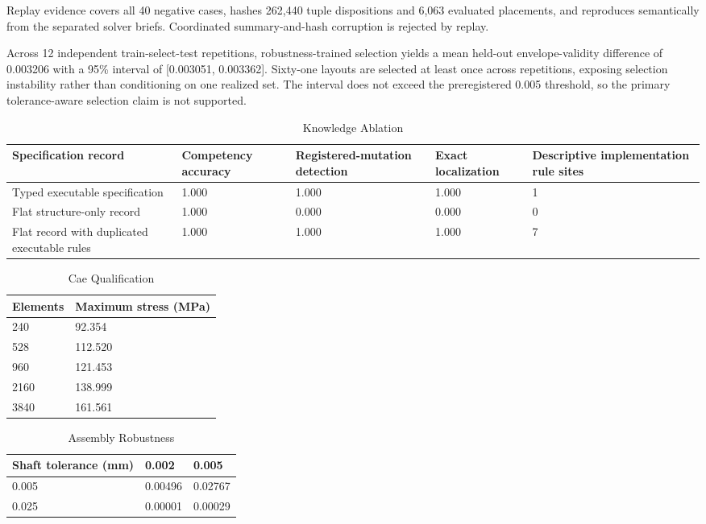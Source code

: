 \documentclass[preprint,12pt]{elsarticle}
\begin{document}
Replay evidence covers all 40 negative cases, hashes 262,440 tuple dispositions and 6,063 evaluated placements, and reproduces semantically from the separated solver briefs. Coordinated summary-and-hash corruption is rejected by replay.

Across 12 independent train-select-test repetitions, robustness-trained selection yields a mean held-out envelope-validity difference of 0.003206 with a 95\% interval of [0.003051, 0.003362]. Sixty-one layouts are selected at least once across repetitions, exposing selection instability rather than conditioning on one realized set. The interval does not exceed the preregistered 0.005 threshold, so the primary tolerance-aware selection claim is not supported.

\begin{table}[htbp]
\centering
\caption{Knowledge Ablation}
\small
\begin{tabular}{lllll}
\textbf{Specification record} & \textbf{Competency accuracy} & \textbf{Registered-mutation detection} & \textbf{Exact localization} & \textbf{Descriptive implementation rule sites} \\
\hline
Typed executable specification & 1.000 & 1.000 & 1.000 & 1 \\
Flat structure-only record & 1.000 & 0.000 & 0.000 & 0 \\
Flat record with duplicated executable rules & 1.000 & 1.000 & 1.000 & 7 \\
\end{tabular}
\end{table}
\begin{table}[htbp]
\centering
\caption{Cae Qualification}
\small
\begin{tabular}{ll}
\textbf{Elements} & \textbf{Maximum stress (MPa)} \\
\hline
240 & 92.354 \\
528 & 112.520 \\
960 & 121.453 \\
2160 & 138.999 \\
3840 & 161.561 \\
\end{tabular}
\end{table}
\begin{table}[htbp]
\centering
\caption{Assembly Robustness}
\small
\begin{tabular}{lll}
\textbf{Shaft tolerance (mm)} & \textbf{0.002} & \textbf{0.005} \\
\hline
0.005 & 0.00496 & 0.02767 \\
0.025 & 0.00001 & 0.00029 \\
\end{tabular}
\end{table}
\end{document}
